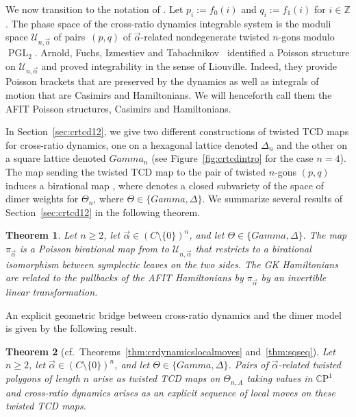 \documentclass[10pt,a4paper]{amsart}
\numberwithin{equation}{section}
\newtheorem{Theorem}{Theorem}[section]
\newcommand{\Z}{{\mathbb Z}}
\newcommand{\C}{{\mathbb C}}
\newcommand{\CP}{{\mathbb C\mathrm P}}
\newcommand{\A}{{\mathbb A}}
\newcommand{\PGL}{\operatorname{PGL}}
\newcommand{\ra}{\rightarrow}
\def\A{A}
\def\Gamma{Gamma}
\def\C{C}
\begin{document}
	We now transition to the notation of \cite{AFIT}. Let $p_i := f_0(i)$ and $q_i := f_1(i)$ for $i \in \Z$.
	The phase space of the cross-ratio dynamics integrable system is the moduli space ${\mathcal U}_{n,\vec\alpha}$ of pairs~$(p,q)$ of $\vec\alpha$-related nondegenerate twisted $n$-gons modulo $\PGL_2$. Arnold, Fuchs, Izmestiev and Tabachnikov~\cite{AFIT} identified a Poisson structure on ${\mathcal U}_{n,\vec\alpha}$ and proved integrability in the sense of Liouville. Indeed, they provide Poisson brackets that are preserved by the dynamics as well as integrals of motion that are Casimirs and Hamiltonians. We will henceforth call them the AFIT Poisson structures, Casimirs and Hamiltonians.
	
	In Section~\ref{sec:crtcd12}, we give two different constructions of twisted TCD maps for cross-ratio dynamics, one on a hexagonal lattice denoted $\Delta_n$ and the other on a square lattice denoted $\Gamma_n$ (see Figure~\ref{fig:crtcdintro} for the case $n=4$). The map sending the twisted TCD map to the pair of twisted $n$-gons $(p,q)$ induces a birational map \smash{$\pi_{\vec{\alpha}}\colon \mathcal X_{N_{\Theta_n},\vec \alpha}^\lambda \ra {\mathcal U}_{n,\vec\alpha}$}, where  denotes a closed subvariety of the space of dimer weights for $\Theta_n$, where $\Theta \in \{\Gamma,\Delta\}$. We summarize several results of Section~\ref{sec:crtcd12} in the following theorem.
	\begin{Theorem}
		\label{thm:main1}
		Let $n\geq2$, let $\vec{\alpha}\in(\C\setminus\{0\})^n$, and let $\Theta \in \{\Gamma,\Delta\}$. The map $\pi_{\vec{\alpha}}$ is a Poisson birational map from  to ${\mathcal U}_{n,\vec\alpha}$ that restricts to a birational isomorphism between symplectic leaves on the two sides. The GK Hamiltonians are related to the pullbacks of the AFIT Hamiltonians by $\pi_{\vec{\alpha}}$ by an invertible linear transformation.
	\end{Theorem}	
	
	An explicit geometric bridge between cross-ratio dynamics and the dimer model is given by the following result.
	
	\begin{Theorem}[cf.\ Theorems~\ref{thm:crdynamicslocalmoves} and~\ref{thm:sqseq}] \label{thm:main2}
		Let $n\geq2$, let $\vec{\alpha}\in(\C\setminus\{0\})^n$, and let $\Theta \in \{\Gamma,\Delta\}$. Pairs of $\vec{\alpha}$-related twisted polygons of length $n$ arise as twisted TCD maps on $\Theta_{n,\A}$ taking values in $\CP^1$ and cross-ratio dynamics arises as an explicit sequence of local moves on these twisted TCD maps.
	\end{Theorem}
	
\end{document}
